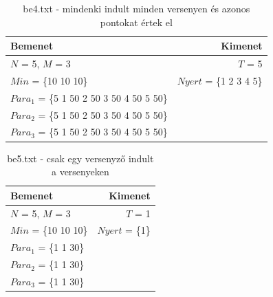 \documentclass[a4paper]{article}
\begin{document}
      \begin{table}[H]
        \caption*{be4.txt - mindenki indult minden versenyen és azonos pontokat értek el}
        \begin{tabular*}{\textwidth}{lr}
          \toprule
          Bemenet & Kimenet \\
          \midrule
          $N$ = 5, $M$ = 3 & $T$ = 5 \\
          $Min$ = \{10 10 10\} & $Nyert$ = \{1 2 3 4 5\} \\
          $Para_1$ = \{5 1 50 2 50 3 50 4 50 5 50\} \\
          $Para_2$ = \{5 1 50 2 50 3 50 4 50 5 50\} \\
          $Para_3$ = \{5 1 50 2 50 3 50 4 50 5 50\} \\
          \bottomrule
        \end{tabular*}
      \end{table}
      \begin{table}[H]
        \caption*{be5.txt -  csak egy versenyző indult a versenyeken}
        \begin{tabular*}{\textwidth}{lr}
          \toprule
          Bemenet & Kimenet \\
          \midrule
          $N$ = 5, $M$ = 3 & $T$ = 1 \\
          $Min$ = \{10 10 10\} & $Nyert$ = \{1\} \\
          $Para_1$ = \{1 1 30\} \\
          $Para_2$ = \{1 1 30\} \\
          $Para_3$ = \{1 1 30\} \\
          \bottomrule
        \end{tabular*}
      \end{table}
\end{document}
